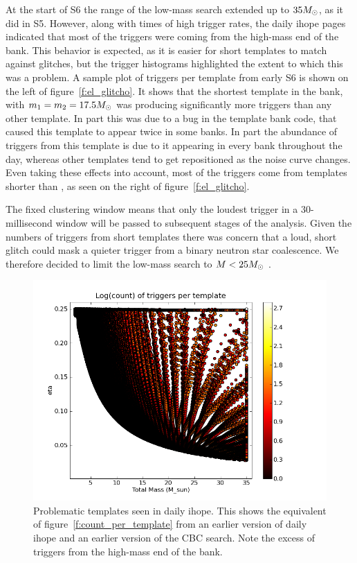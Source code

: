 At the start of S6 the range of the low-mass search extended up to $35
M_\odot$, as it did in S5.  However, along with times of high trigger
rates, the daily ihope pages indicated that most of the triggers were
coming from the high-mass end of the bank.  This behavior is expected,
as it is easier for short templates to match against glitches, but the
trigger histograms highlighted the extent to which this was a problem.
A sample plot of triggers per template from early S6 is shown on the
left of figure~\ref{f:el_glitcho}.  It shows that the shortest
template in the bank, with $m_1 = m_2 = 17.5 M_\odot$ was producing
significantly more triggers than any other template.  In part this was
due to a bug in the template bank code, that caused this template to
appear twice in some banks.  In part the abundance of triggers from
this template is due to it appearing in every bank throughout the day,
whereas other templates tend to get repositioned as the noise curve
changes.  Even taking these effects into account, most of the triggers
come from templates shorter than , as seen on the right of
figure~\ref{f:el_glitcho}.  

The fixed clustering window means that only the loudest trigger in a
30-millisecond window will be passed to subsequent stages of the
analysis.  Given the numbers of triggers from short templates there
was concern that a loud, short glitch could mask a quieter trigger
from a binary neutron star coalescence.  We therefore decided to limit
the low-mass search to $M < 25 M_\odot$ .




\begin{figure}
  \includegraphics[width=\linewidth]{figures/detchar/20090806_H1_0_UNCLUSTERED_template_counts}
  \caption[Problematic templates seen in daily ihope]{
  \label{f:daily_ihope_el_glitcho}
Problematic templates seen in daily ihope.  This shows the equivalent 
of figure~\ref{f:count_per_template} from an earlier version of daily
ihope and an earlier version of the CBC search.  Note the excess of
triggers from the high-mass end of the bank.  
}
\end{figure}%



